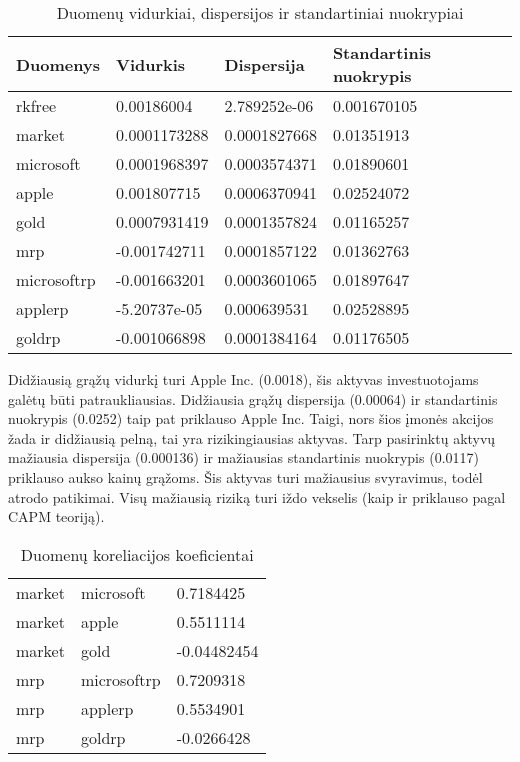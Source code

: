 \documentclass[12pt, a14paper, lithuanian]{article}
\begin{document}
\begin{table}[ht]
\begin{center}
    \begin{tabular}{ | l | l | l | l |}
    \hline
    Duomenys & Vidurkis & Dispersija & Standartinis nuokrypis \\
    \hline
    rkfree & 0.00186004 & 2.789252e-06 & 0.001670105 \\
    market & 0.0001173288 & 0.0001827668 & 0.01351913 \\
    microsoft & 0.0001968397 & 0.0003574371 & 0.01890601 \\
    apple & 0.001807715 & 0.0006370941 & 0.02524072 \\  
    gold & 0.0007931419 & 0.0001357824 & 0.01165257 \\
    mrp & -0.001742711 & 0.0001857122 & 0.01362763 \\
    microsoftrp & -0.001663201 & 0.0003601065 & 0.01897647 \\
    applerp & -5.20737e-05 & 0.000639531 & 0.02528895 \\
    goldrp & -0.001066898 & 0.0001384164 & 0.01176505 \\
    \hline
    \end{tabular}
\end{center}
\caption{Duomenų vidurkiai, dispersijos ir standartiniai nuokrypiai}
\end{table}




Didžiausią grąžų vidurkį turi Apple Inc. (0.0018), šis aktyvas investuotojams galėtų būti  patraukliausias.
Didžiausia grąžų dispersija (0.00064) ir standartinis nuokrypis (0.0252) taip pat priklauso Apple Inc. Taigi, nors šios įmonės akcijos žada ir didžiausią pelną, tai yra rizikingiausias aktyvas.
Tarp pasirinktų aktyvų mažiausia dispersija (0.000136) ir mažiausias standartinis nuokrypis (0.0117) priklauso aukso kainų grąžoms. Šis aktyvas turi mažiausius svyravimus, todėl atrodo patikimai. Visų mažiausią riziką turi iždo vekselis (kaip ir priklauso pagal CAPM teoriją).


\begin{table}[ht]
\begin{center}
    \begin{tabular}{ | l | l | l | }
    \hline
    market & microsoft & 0.7184425 \\
  market & apple & 0.5511114 \\
	market & gold & -0.04482454 \\
	mrp & microsoftrp & 0.7209318 \\
	mrp & applerp & 0.5534901 \\
	mrp & goldrp & -0.0266428 \\
	\hline
    \end{tabular}
\end{center}
\caption{Duomenų koreliacijos koeficientai}
\end{table}
\end{document}
